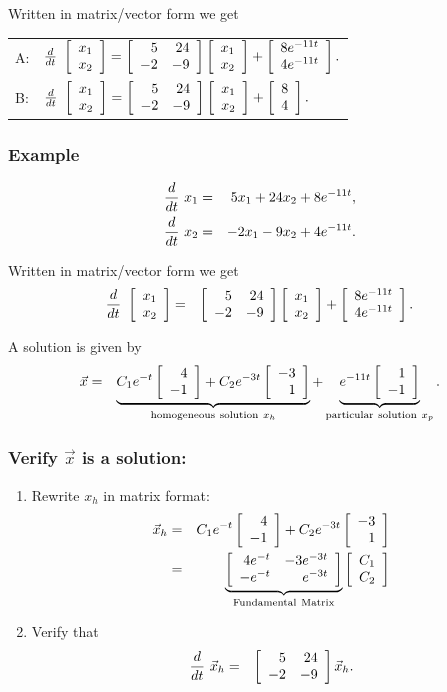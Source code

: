 {\begin{frame}
{   Written in matrix/vector form we get\\[12pt]

   \begin{tabular}{ll}
          A: &  $\deriv{~}{t} \vecTwo{x_1}{x_2}  =  
      \arrayTwo{5}{24}{-2}{-9} \vecTwo{x_1}{x_2}
      + \vecTwo{8e^{-11t}}{4e^{-11t}}.$
       \\[12pt]
          B: &  $\deriv{~}{t} \vecTwo{x_1}{x_2}  =  
      \arrayTwo{5}{24}{-2}{-9} \vecTwo{x_1}{x_2}
      + \vecTwo{8}{4}.$
       \\
    \end{tabular}


        \vfill
 }\fi
\end{frame}
}

\begin{frame}
  \frametitle{Example}

  \begin{eqnarray*}
    \deriv{~}{t} x_1 & = & 5  x_1 + 24 x_2 + 8 e^{-11t}, \\
    \deriv{~}{t} x_2 & = & -2 x_1 -  9 x_2 + 4 e^{-11t}.
  \end{eqnarray*}

  {
    Written in matrix/vector form we get
    \begin{eqnarray*}
      \deriv{~}{t} \vecTwo{x_1}{x_2} & = & 
      \arrayTwo{5}{24}{-2}{-9} \vecTwo{x_1}{x_2}
      + \vecTwo{8e^{-11t}}{4e^{-11t}}.
    \end{eqnarray*}
  }

  {
   A solution is given by
    \begin{eqnarray*}
      \vec{x} & = &  
      \underbrace{C_1 e^{-t} \vecTwo{4}{-1} + C_2 e^{-3t} \vecTwo{-3}{1}}_{\mathrm{homogeneous ~solution~} x_h} 
      + \underbrace{ e^{-11t} \vecTwo{1}{-1}}_{\mathrm{particular~ solution}~ x_p}.
    \end{eqnarray*}
  }
\end{frame}


\begin{frame}
  \frametitle{Verify $\vec{x}$ is a solution:}

  \begin{enumerate}
  \item Rewrite $x_h$ in matrix format: 
    \begin{eqnarray*}
      \vec{x}_h & = & C_1 e^{-t} \vecTwo{4}{-1} 
      + C_2 e^{-3t} \vecTwo{-3}{1}\\
      & = & 
      \underbrace{\arrayTwo{4e^{-t}}{-3e^{-3t}}{-e^{-t}}{e^{-3t}}}_{\mathrm{Fundamental~Matrix}}
      \vecTwo{C_1}{C_2} 
    \end{eqnarray*}
   
  \item Verify that  
    \begin{eqnarray*}
      \deriv{~}{t} \vec{x}_h & = & \arrayTwo{5}{24}{-2}{-9} \vec{x}_h.
    \end{eqnarray*}
 
  \end{enumerate}

\end{frame}

